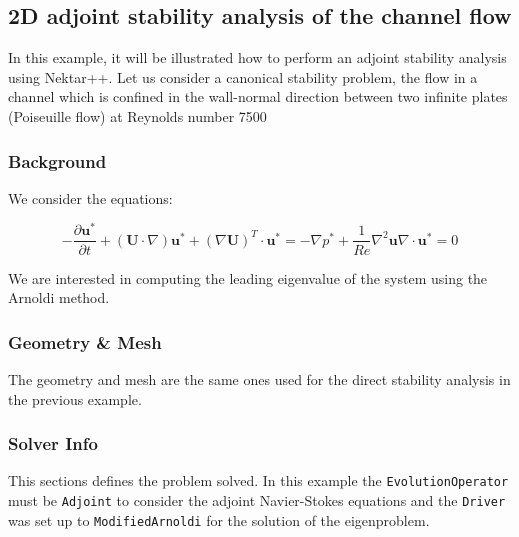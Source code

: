  \subsection{2D adjoint stability analysis of the channel flow}

 In this example, it will be illustrated how to perform an adjoint stability analysis using Nektar++. Let us consider a canonical stability problem, the flow in a channel which is confined in the wall-normal direction between two infinite plates (Poiseuille flow) at Reynolds number 7500
 
 \subsubsection{Background}
 
  We consider the equations: 
  
  \begin{subequations}
  \begin{equation}
  -\frac{\partial \mathbf{u}^*}{\partial t}+(\mathbf{U} \cdot \nabla)\mathbf{u}^*+(\nabla \mathbf{U})^T \cdot \mathbf{u}^*=-\nabla p^*+\frac{1}{Re} \nabla^2 \mathbf{u}
  \end{equation}
  
  \begin{equation}
  \nabla \cdot \mathbf{u}^*=0
  \end{equation} 
  \end{subequations}
  
  We are interested in computing the leading eigenvalue of the system using the Arnoldi method.
  
 \subsubsection{Geometry \& Mesh}
 
 The geometry and mesh are the same ones used for the direct stability analysis in the previous example.
 
 \subsubsection{Solver Info}
 
 This sections defines the problem solved. In this example the \texttt{EvolutionOperator} must be \texttt{Adjoint} to consider the adjoint Navier-Stokes equations and the \texttt{Driver} was set up to \texttt{ModifiedArnoldi} for the solution of the eigenproblem. 

